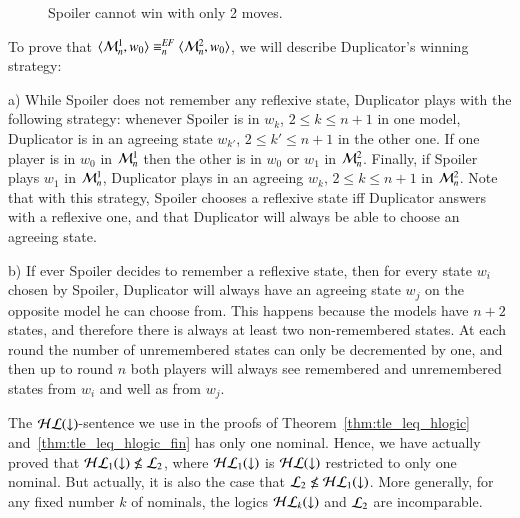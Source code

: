 \begin{pf}
\begin{figure}
\begin{center}
\end{center}
\caption{Spoiler cannot win with only 2 moves.}\label{M1yM2}
\end{figure}

To prove that $\langle \mathcal{M}^1_n,w_0 \rangle\equiv^{\mathit{EF}}_n\langle \mathcal{M}^2_n,w_0 \rangle$, we
will describe Duplicator's winning strategy:
\smallskip

\noindent a) While Spoiler does not remember any reflexive state,
Duplicator plays with the following strategy: whenever Spoiler is in
$w_k$, $2\leq k \leq n+1$ in one model, Duplicator is in an agreeing
state $w_{k'}$, $2\leq k' \leq n+1$ in the other one. If one player
is in $w_0$ in $\mathcal{M}^1_n$ then the other is
in $w_0$ or $w_1$ in $\mathcal{M}^2_n$. Finally, if Spoiler plays $w_1$
in $\mathcal{M}^1_n$, Duplicator plays in an agreeing $w_k$, $2\leq k
\leq n+1$ in $\mathcal{M}^2_n$. Note that with this strategy, Spoiler
chooses a reflexive state iff Duplicator answers with a reflexive
one, and that Duplicator will always be able to choose an agreeing
state.

\noindent b) If ever Spoiler decides to remember a reflexive state,
then for every state $w_i$ chosen by
Spoiler, Duplicator will always have an agreeing state $w_j$ on the
opposite model he can choose from. This happens because the models
have $n+2$ states, and therefore there is always at least two
non-remembered states. At each round the number of unremembered
states can only be decremented by one, and then up to round $n$ both
players will always see remembered and unremembered states from
$w_i$ and well as from $w_j$.
\end{pf}


The $\mathcal{HL}({\downarrow})$-sentence we use in the proofs of
Theorem~\ref{thm:tle_leq_hlogic} and~\ref{thm:tle_leq_hlogic_fin}
has only one nominal.
  Hence, we have actually proved that
$\mathcal{HL}_1({\downarrow})\not\le\mathcal{L}_2$, where $\mathcal{HL}_1({\downarrow})$ is $\mathcal{HL}({\downarrow})$
restricted to only one nominal.  But actually, it is also the case
that $\mathcal{L}_2 \not\le\mathcal{HL}_1({\downarrow})$.  More generally, for any fixed
number $k$ of nominals, the logics $\mathcal{HL}_k({\downarrow})$ and $\mathcal{L}_2$ are
incomparable.

